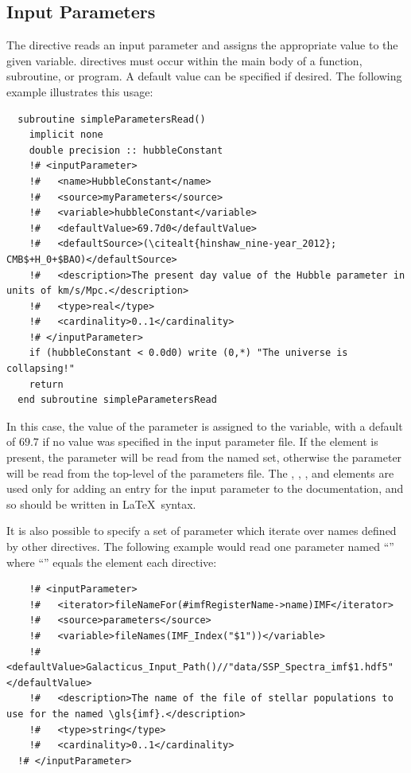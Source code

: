 \subsection{Input Parameters}

The  directive reads an input parameter and assigns the appropriate value to the given variable.  directives must occur within the main body of a function, subroutine, or program. A default value can be specified if desired. The following example illustrates this usage:

\begin{lstlisting}
  subroutine simpleParametersRead()
    implicit none
    double precision :: hubbleConstant
    !# <inputParameter>
    !#   <name>HubbleConstant</name>
    !#   <source>myParameters</source>
    !#   <variable>hubbleConstant</variable>
    !#   <defaultValue>69.7d0</defaultValue>
    !#   <defaultSource>(\citealt{hinshaw_nine-year_2012}; CMB$+H_0+$BAO)</defaultSource>
    !#   <description>The present day value of the Hubble parameter in units of km/s/Mpc.</description>
    !#   <type>real</type>
    !#   <cardinality>0..1</cardinality>
    !# </inputParameter>
    if (hubbleConstant < 0.0d0) write (0,*) "The universe is collapsing!"
    return
  end subroutine simpleParametersRead
\end{lstlisting}

In this case, the value of the  parameter is assigned to the  variable, with a default of $69.7$ if no value was specified in the input parameter file. If the  element is present, the parameter will be read from the named  set, otherwise the parameter will be read from the top-level of the parameters file. The , , , and  elements are used only for adding an entry for the input parameter to the documentation, and so should be written in \LaTeX\ syntax.

It is also possible to specify a set of parameter which iterate over names defined by other directives. The following example would read one parameter named ``'' where ``'' equals the  element each  directive:
\begin{lstlisting}
    !# <inputParameter>
    !#   <iterator>fileNameFor(#imfRegisterName->name)IMF</iterator>
    !#   <source>parameters</source>
    !#   <variable>fileNames(IMF_Index("$1"))</variable>
    !#   <defaultValue>Galacticus_Input_Path()//"data/SSP_Spectra_imf$1.hdf5"</defaultValue>
    !#   <description>The name of the file of stellar populations to use for the named \gls{imf}.</description>
    !#   <type>string</type>
    !#   <cardinality>0..1</cardinality>
  !# </inputParameter>
\end{lstlisting}

